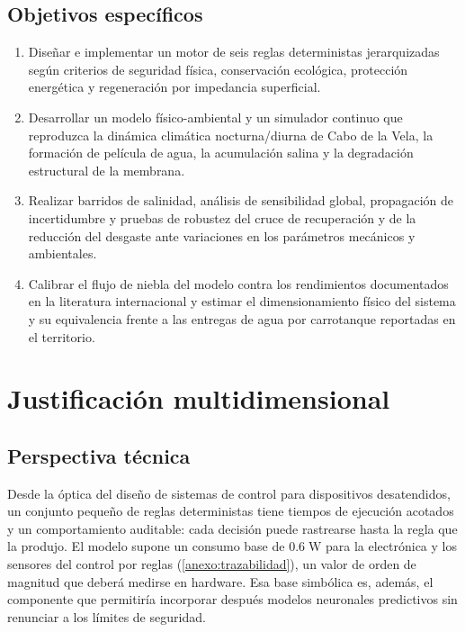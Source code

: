 \subsection{Objetivos espec\'ificos}
\begin{enumerate}[leftmargin=*]
  \item Dise\~nar e implementar un motor de seis reglas deterministas jerarquizadas seg\'un criterios de seguridad f\'isica, conservaci\'on ecol\'ogica, protecci\'on energ\'etica y regeneraci\'on por impedancia superficial.
  \item Desarrollar un modelo f\'isico-ambiental y un simulador continuo que reproduzca la din\'amica clim\'atica nocturna/diurna de Cabo de la Vela, la formaci\'on de pel\'icula de agua, la acumulaci\'on salina y la degradaci\'on estructural de la membrana.
  \item Realizar barridos de salinidad, an\'alisis de sensibilidad global, propagaci\'on de incertidumbre y pruebas de robustez del cruce de recuperaci\'on y de la reducci\'on del desgaste ante variaciones en los par\'ametros mec\'anicos y ambientales.
  \item Calibrar el flujo de niebla del modelo contra los rendimientos documentados en la literatura internacional y estimar el dimensionamiento f\'isico del sistema y su equivalencia frente a las entregas de agua por carrotanque reportadas en el territorio.
\end{enumerate}

\section{Justificaci\'on multidimensional}

\subsection{Perspectiva t\'ecnica}
Desde la \'optica del dise\~no de sistemas de control para dispositivos desatendidos, un conjunto peque\~no de reglas deterministas tiene tiempos de ejecuci\'on acotados y un comportamiento auditable: cada decisi\'on puede rastrearse hasta la regla que la produjo. El modelo supone un consumo base de $0.6\;\text{W}$ para la electr\'onica y los sensores del control por reglas (\cref{anexo:trazabilidad}), un valor de orden de magnitud que deber\'a medirse en hardware. Esa base simb\'olica es, adem\'as, el componente que permitir\'ia incorporar despu\'es modelos neuronales predictivos sin renunciar a los l\'imites de seguridad.

